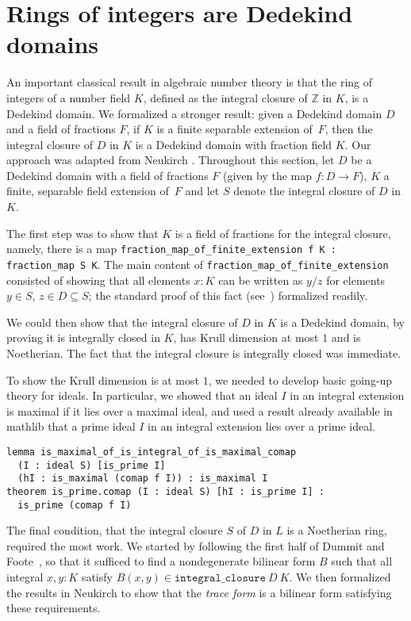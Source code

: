 \documentclass[a4paper,USenglish,cleveref, autoref, thm-restate]{lipics-v2021}
\newcommand{\lean}[1]{\texttt{#1}\xspace}
\newcommand{\mathlib}{\textsf{mathlib}\xspace}
\newcommand{\Z}{\mathbb{Z}}
\begin{document}
\section{Rings of integers are Dedekind domains} \label{sec:integral-closure}

An important classical result in algebraic number theory is that the ring of integers of a number field $K$, defined as the integral closure of $\Z$ in $K$, is a Dedekind domain. We formalized a stronger result: given a Dedekind domain $D$ and a field of fractions $F$, if $K$ is a finite separable extension of~$F$, then the integral closure of $D$ in $K$ is a Dedekind domain with fraction field $K$.
Our approach was adapted from Neukirch \cite[Theorem~3.1]{Neukirch}.
Throughout this section, let $D$ be a Dedekind domain with a field of fractions $F$ (given by the map $f \colon D \to F$), $K$ a finite, separable field extension of~$F$ and let $S$ denote the integral closure of $D$ in $K$.

The first step was to show that $K$ is a field of fractions for the integral closure, namely, there is a map \lean{fraction\_map\_of\_finite\_extension f K : fraction\_map S K}.
The main content of \lean{fraction\_map\_of\_finite\_extension} consisted of showing that all elements $x : K$ can be written as $y / z$ for elements $y \in S$, $z \in D \subseteq S$;
the standard proof of this fact (see~\cite[Theorem~15.29]{Dummit-and-Foote}) formalized readily.

We could then show that the integral closure of $D$ in $K$ is a Dedekind domain,
by proving it is integrally closed in $K$, has Krull dimension at most $1$ and is Noetherian.
The fact that the integral closure is integrally closed was immediate.

To show the Krull dimension is at most $1$, we needed to develop basic going-up theory for ideals.
In particular, we showed that an ideal $I$ in an integral extension is maximal if it lies over a maximal ideal,
and used a result already available in \mathlib that a prime ideal $I$ in an integral extension lies over a prime ideal.
\begin{lstlisting}
lemma is_maximal_of_is_integral_of_is_maximal_comap
  (I : ideal S) [is_prime I]
  (hI : is_maximal (comap f I)) : is_maximal I
theorem is_prime.comap (I : ideal S) [hI : is_prime I] :
  is_prime (comap f I)
\end{lstlisting}

The final condition, that the integral closure $S$ of $D$ in $L$ is a Noetherian ring, required the most work.
We started by following the first half of Dummit and Foote~\cite[Theorem~15.29]{Dummit-and-Foote},
so that it sufficed to find a nondegenerate bilinear form $B$ such that all integral $x, y : K$ satisfy $B(x, y) \in \lean{integral\_closure}\ D\ K$.
We then formalized the results in Neukirch \cite[\S\S~2.5--2.8]{Neukirch} to show that the \emph{trace form} is a bilinear form satisfying these requirements.
\end{document}
